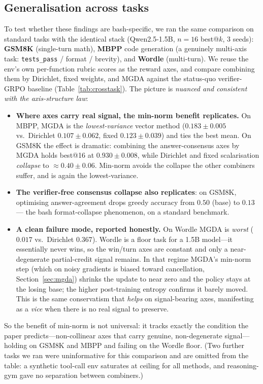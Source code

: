 \documentclass[11pt,a4paper]{article}
\begin{document}
\subsection{Generalisation across tasks}
\label{sec:exp-crosstask}

To test whether these findings are bash-specific, we ran the same comparison on
standard tasks with the identical stack (Qwen2.5-1.5B, $n{=}16$ best@$k$, 3
seeds): \textbf{GSM8K} (single-turn math), \textbf{MBPP} code generation (a
genuinely multi-axis task: \texttt{tests\_pass} / format / brevity), and
\textbf{Wordle} (multi-turn).  We reuse the env's own per-function rubric scores
as the reward axes, and compare combining them by Dirichlet, fixed weights, and
MGDA against the status-quo verifier-GRPO baseline (Table~\ref{tab:crosstask}).
The picture is \emph{nuanced and consistent with the axis-structure law}:
\begin{itemize}[nosep]
\item \textbf{Where axes carry real signal, the min-norm benefit replicates.}
  On MBPP, MGDA is the \emph{lowest-variance} vector method ($0.183\pm0.005$ vs.\
  Dirichlet $0.107\pm0.062$, fixed $0.123\pm0.039$) and ties the best mean.  On
  GSM8K the effect is dramatic: combining the answer-consensus axes by MGDA holds
  best@16 at $0.930\pm0.008$, while Dirichlet and fixed scalarisation
  \emph{collapse} to $\approx0.40\pm0.06$.  Min-norm avoids the collapse the other
  combiners suffer, and is again the lowest-variance.
\item \textbf{The verifier-free consensus collapse also replicates}: on GSM8K,
  optimising answer-agreement drops greedy accuracy from $0.50$ (base) to $0.13$
  --- the bash format-collapse phenomenon, on a standard benchmark.
\item \textbf{A clean failure mode, reported honestly.}  On Wordle MGDA is
  \emph{worst} ($0.017$ vs.\ Dirichlet $0.367$).  Wordle is a floor task for a
  1.5B model---it essentially never wins, so the win/turn axes are constant and
  only a near-degenerate partial-credit signal remains.  In that regime MGDA's
  min-norm step (which on noisy gradients is biased toward cancellation,
  Section~\ref{sec:mgda}) shrinks the update to near zero and the policy stays at
  the losing base; the higher post-training entropy confirms it barely moved.
  This is the same conservatism that \emph{helps} on signal-bearing axes,
  manifesting as a \emph{vice} when there is no real signal to preserve.
\end{itemize}
So the benefit of min-norm is not universal: it tracks exactly the condition the
paper predicts---non-collinear axes that carry genuine, non-degenerate
signal---holding on GSM8K and MBPP and failing on the Wordle floor.  (Two further
tasks we ran were uninformative for this comparison and are omitted from the
table: a synthetic tool-call env saturates at ceiling for all methods, and
reasoning-gym gave no separation between combiners.)
\end{document}
